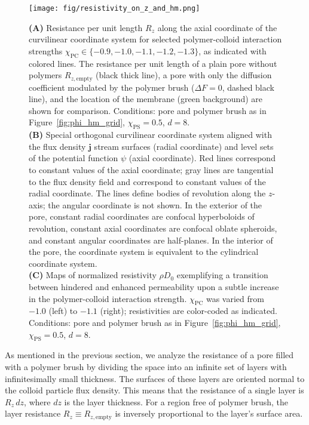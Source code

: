 \documentclass[12pt, a4paper]{article}
\begin{document}
\begin{figure}
    \centering
    \texttt{[image: fig/resistivity\_on\_z\_and\_hm.png]}
    \caption{
    \textbf{(A)} Resistance per unit length $R_{z}$ along the axial coordinate of the curvilinear coordinate system for selected polymer-colloid interaction strengths $\chi_{\textrm{PC}} \in \{ -0.9, -1.0, -1.1, -1.2, -1.3\}$, as indicated with colored lines.
    The resistance per unit length of a plain pore without polymers $R_{z, \textrm{empty}}$ (black thick line), a pore with only the diffusion coefficient modulated by the polymer brush ($\Delta F = 0$, dashed black line), and the location of the membrane (green background) are shown for comparison. 
    Conditions: pore and polymer brush as in Figure~\ref{fig:phi_hm_grid}, $\chi_{\textrm{PS}}=0.5$, $d=8$.
    \\
    \textbf{(B)} Special orthogonal curvilinear coordinate system aligned with the flux density $\bm{j}$ stream surfaces (radial coordinate) and level sets of the potential function $\psi$ (axial coordinate).
    Red lines correspond to constant values of the axial coordinate; gray lines are tangential to the flux density field and correspond to constant values of the radial coordinate.
    The lines define bodies of revolution along the $z$-axis; the angular coordinate is not shown.
    In the exterior of the pore, constant radial coordinates are confocal hyperboloids of revolution, constant axial coordinates are confocal oblate spheroids, and constant angular coordinates are half-planes.
    In the interior of the pore, the coordinate system is equivalent to the cylindrical coordinate system.
    \\
    \textbf{(C)} Maps of normalized resistivity $\rho D_0$ exemplifying a transition between hindered and enhanced permeability upon a subtle increase in the polymer-colloid interaction strength.
    $\chi_{\textrm{PC}}$ was varied from $-1.0$ (left) to $-1.1$ (right); resistivities are color-coded as indicated. 
    Conditions: pore and polymer brush as in Figure~\ref{fig:phi_hm_grid}, $\chi_{\textrm{PS}}=0.5$, $d=8$.
    }
    \label{fig:R_map}
\end{figure}

As mentioned in the previous section, we analyze the resistance of a pore filled with a polymer brush by dividing the space into an infinite set of layers with infinitesimally small thickness.
The surfaces of these layers are oriented normal to the colloid particle flux density.
This means that the resistance of a single layer is $R_z \, dz$, where $dz$ is the layer thickness.
For a region free of polymer brush, the layer resistance $R_z \equiv R_{z, \text{empty}}$ is inversely proportional to the layer's surface area.
\end{document}
